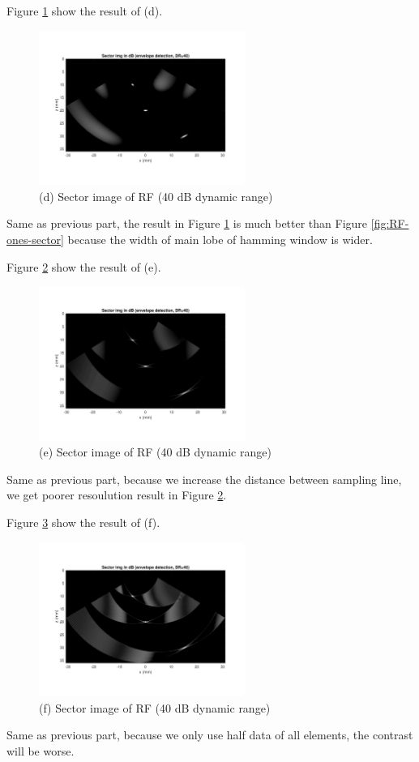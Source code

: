 \documentclass{article}
\begin{document}
Figure \ref{fig:RF-hanning-sector} show the result of (d).
\begin{figure}[H]
    \centering
    \includegraphics[width=0.6\textwidth]{src/RF/b-9-hanning.pdf}
    \caption{(d) Sector image of RF (40 dB dynamic range)}
    \label{fig:RF-hanning-sector}
\end{figure}
Same as previous part, the result in Figure \ref{fig:RF-hanning-sector} is much better than Figure \ref{fig:RF-ones-sector} because
the width of main lobe of hamming window is wider.

Figure \ref{fig:RF-2pitch-sector} show the result of (e).
\begin{figure}[H]
    \centering
    \includegraphics[width=0.6\textwidth]{src/RF/b-9-2pitch.pdf}
    \caption{(e) Sector image of RF (40 dB dynamic range)}
    \label{fig:RF-2pitch-sector}
\end{figure}
Same as previous part, because we increase the distance between sampling line, we get poorer resoulution result in 
Figure \ref{fig:RF-2pitch-sector}.

Figure \ref{fig:RF-everyones-sector} show the result of (f).
\begin{figure}[H]
    \centering
    \includegraphics[width=0.6\textwidth]{src/RF/b-9-everyones.pdf}
    \caption{(f) Sector image of RF (40 dB dynamic range)}
    \label{fig:RF-everyones-sector}
\end{figure}
Same as previous part, because we only use half data of all elements, the contrast will be worse.
\end{document}
